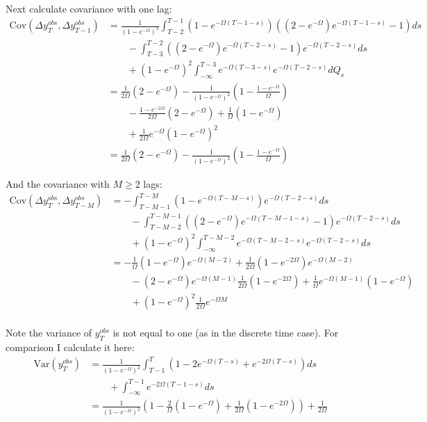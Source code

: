 \documentclass[12pt,pdftex,letterpaper]{article}
\begin{document}
Next calculate covariance with one lag:
\begin{align*}
\mathrm{Cov}(\Delta y_T^{obs},\Delta y_{T-1}^{obs}) 
&=\frac{1}{(1-e^{-\Omega})^2}\int_{T-2}^{T-1}  ( 1 - e^{-\Omega (T-1-s)} ) \left( (2-e^{-\Omega}) e^{-\Omega (T-1-s)} -1  \right) ds \\
 & \qquad - \int_{T-3}^{T-2}\left( (2-e^{-\Omega}) e^{-\Omega (T-2-s)} -1  \right) e^{-\Omega (T-2-s)} ds \\
& \qquad +  (1-e^{-\Omega})^2 \int_{-\infty}^{T-3}  e^{-\Omega (T-3-s)}  e^{-\Omega (T-2-s)} dQ_s \\
&=   \frac{1}{2\Omega}(2-e^{-\Omega}) - \frac{1}{(1-e^{-\Omega})^2}( 1 - \frac{1-e^{-\Omega}}{\Omega}) \\
& \qquad - \frac{1-e^{-2\Omega}}{2\Omega}\left( 2- e^{-\Omega} \right) + \frac{1}{\Omega}(1-e^{-\Omega}) \\
& \qquad +  \frac{1 }{2\Omega} e^{-\Omega}(1-e^{-\Omega})^2 \\
&=   \frac{1}{2\Omega}(2-e^{-\Omega}) - \frac{1}{(1-e^{-\Omega})^2}( 1 - \frac{1-e^{-\Omega}}{\Omega})
\end{align*}





And the covariance with $M \geq 2$ lags: 
\begin{align*}
\mathrm{Cov}(\Delta y_T^{obs},\Delta y_{T-M}^{obs}) 
&=-\int_{T-M-1}^{T-M}  ( 1 - e^{-\Omega (T-M-s)} ) e^{-\Omega (T-2-s)} ds \\ 
& \qquad - \int_{T-M-2}^{T-M-1}\left( (2-e^{-\Omega}) e^{-\Omega (T-M-1-s)} -1  \right)e^{-\Omega (T-2-s)} ds \\
& \qquad +  (1-e^{-\Omega})^2 \int_{-\infty}^{T-M-2}  e^{-\Omega (T-M-2-s)} e^{-\Omega (T-2-s)} ds \\
&= -\frac{1}{\Omega}(1-e^{-\Omega})e^{-\Omega (M-2)} +\frac{1}{2\Omega}(1-e^{-2\Omega})e^{-\Omega (M-2)} \\
& \qquad - (2-e^{-\Omega}) e^{-\Omega(M-1)}\frac{1}{2\Omega}(1-e^{-2\Omega}) + \frac{1}{\Omega} e^{-\Omega(M-1)} (1-e^{-\Omega})\\
& \qquad +(1-e^{-\Omega})^2 \frac{1}{2\Omega} e^{-\Omega M} \\
\end{align*}


Note the variance of $y_T^{obs}$ is not equal to one (as in the discrete time case). For comparison I calculate it here:
\begin{align*}
\mathrm{Var}( y_T^{obs}) &= \frac{1}{(1-e^{-\Omega})^2}\int_{T-1}^{T} ( 1 - 2e^{-\Omega (T-s)}  + e^{-2\Omega (T-s)}) ds \\
& \qquad +  \int_{-\infty}^{T-1}  e^{-2\Omega (T-1-s)} ds \\
&= \frac{1}{(1-e^{-\Omega})^2}\left( 1 - \frac{2}{\Omega}(1-e^{-\Omega})    + \frac{1}{2\Omega}(1-e^{-2\Omega}) \right) +  \frac{1}{2\Omega}
\end{align*}
\end{document}
